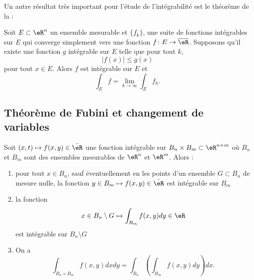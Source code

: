 Un autre résultat très important pour l'étude de l'intégrabilité est le théorème de la :
\begin{theorem}
	Soit $E\subset \eR^n$ un ensemble mesurable et $\{ f_k \}$, une suite de fonctions intégrables sur $E$ qui converge simplement vers une fonction $f\colon E\to \overline{ \eR }$. Supposons qu'il existe une fonction $g$ intégrable sur $E$ telle que pour tout $k$,
\begin{equation}
	| f(x) |\leq g(x)
\end{equation}
pour tout $x\in E$. Alors $f$ est intégrable sur $E$ et 
\begin{equation}
	\int_Ef=\lim_{k\to\infty}\int_Ef_k.
\end{equation}
\end{theorem}

					\subsection{Théorème de Fubini et changement de variables}

\begin{theorem}[Fubini]\label{ThoFubini}
Soit $(x,t)\mapsto f(x,y)\in\bar \eR$ une fonction intégrable sur $B_n\times B_m\subset\eR^{n+m}$ où $B_n$ et $B_m$ sont des ensembles mesurables de $\eR^n$ et $\eR^m$. Alors :
\begin{enumerate}
\item pour tout $x\in B_n$, sauf éventuellement en les points d'un ensemble $G\subset B_n$ de mesure nulle, la fonction $y\in B_m\mapsto f(x,y)\in\bar\eR$ est intégrable sur $B_m$
\item
la fonction
\begin{equation}
	x\in B_n\setminus G\mapsto\int_{B_m}f(x,y)dy\in\eR
\end{equation}
est intégrable sur $B_n\setminus G$

\item 
On a
\begin{equation}
	\int_{B_n\times B_m}f(x,y)dxdy=\int_{B_n}\left( \int_{B_m}f(x,y)dy \right)dx.
\end{equation}

\end{enumerate}
\end{theorem}



